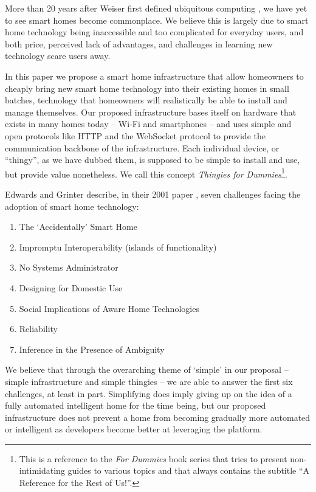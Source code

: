 \documentclass{ubicomp2012}
\begin{document}
More than 20 years after Weiser first defined ubiquitous computing \cite{Weiser1991}, we have yet to see smart homes become commonplace. We believe this is largely due to smart home technology being inaccessible and too complicated for everyday users, and both price, perceived lack of advantages, and challenges in learning new technology scare users away.

In this paper we propose a smart home infrastructure that allow homeowners to cheaply bring new smart home technology into their existing homes in small batches, technology that homeowners will realistically be able to install and manage themselves. Our proposed infrastructure bases itself on hardware that exists in many homes today -- Wi-Fi and smartphones -- and uses simple and open protocols like HTTP and the WebSocket protocol to provide the communication backbone of the infrastructure. Each individual device, or ``thingy'', as we have dubbed them, is supposed to be simple to install and use, but provide value nonetheless. We call this concept \textit{Thingies for Dummies}\footnote{This is a reference to the \textit{For Dummies} book series that tries to present non-intimidating guides to various topics and that always contains the subtitle ``A Reference for the Rest of Us!''.}.

Edwards and Grinter describe, in their 2001 paper \cite{Edwards01athome}, seven challenges facing the adoption of smart home technology:
\begin{enumerate}
\item The `Accidentally' Smart Home
\item Impromptu Interoperability (islands of functionality)
\item No Systems Administrator
\item Designing for Domestic Use
\item Social Implications of Aware Home Technologies
\item Reliability
\item Inference in the Presence of Ambiguity
\end{enumerate}

We believe that through the overarching theme of `simple' in our proposal -- simple infrastructure and simple thingies -- we are able to answer the first six challenges, at least in part. Simplifying does imply giving up on the idea of a fully automated intelligent home for the time being, but our proposed infrastructure does not prevent a home from becoming gradually more automated or intelligent as developers become better at leveraging the platform.
\end{document}
